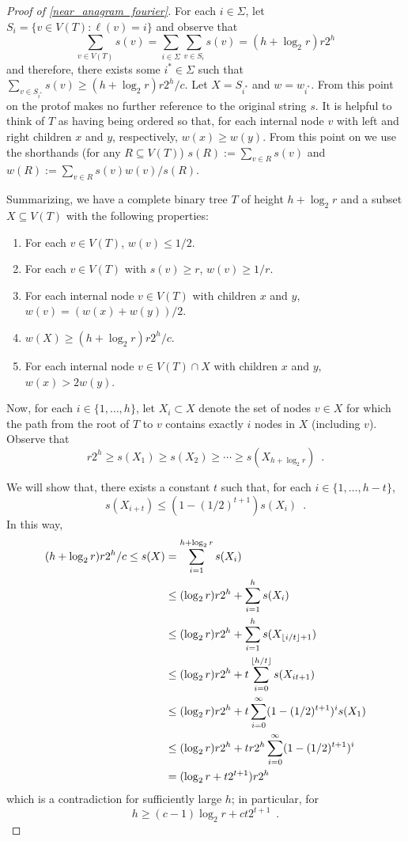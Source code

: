 \documentclass{patmorin}
\begin{document}
\begin{proof}[Proof of \cref{near_anagram_fourier}]
  For each $i\in\Sigma$, let $S_i=\{v\in V(T): \ell(v)=i\}$ and observe that
  \[
      \sum_{v\in V(T)}s(v)=\sum_{i\in\Sigma} \sum_{v\in S_i} s(v) = (h+\log_2 r)r2^{h}
  \]
  and therefore, there exists some $i^*\in\Sigma$ such that $\sum_{v\in
  S_{i^*}}s(v)\ge (h+\log_2 r)r2^h/c$.  Let $X=S_{i^*}$ and $w=w_{i^*}$.
  From this point on the pro{t}of makes no further reference to the original
  string $s$.  It is helpful to think of $T$ as having being ordered
  so that, for each internal node $v$ with left and right children $x$
  and $y$, respectively, $w(x)\ge w(y)$.  From this point on we use
  the shorthands (for any $R\subseteq V(T)$) $s(R):=\sum_{v\in R}s(v)$
  and $w(R):=\sum_{v\in R}s(v)w(v)/s(R)$.

  Summarizing, we have a complete binary tree $T$ of height $h+\log_2 r$ and
  a subset $X\subseteq V(T)$ with the following properties:
  \begin{enumerate}
    \item For each $v\in V(T)$, $w(v) \le 1/2$.
    \item For each $v\in V(T)$ with $s(v) \ge r$, $w(v)\ge 1/r$.
    \item For each internal node $v\in V(T)$ with children $x$ and $y$,
       $w(v) = (w(x)+w(y))/2$.
    \item $w(X) \ge (h+\log_2 r)r2^{h}/c$.
     \item For each internal node $v\in V(T)\cap X$ with children $x$ and $y$,
       $w(x) > 2w(y)$.
  \end{enumerate}
  Now, for each $i\in\{1,\ldots,h\}$, let $X_i\subset X$ denote the
  set of nodes $v\in X$ for which the path from the root of $T$ to $v$
  contains exactly $i$ nodes in $X$ (including $v$).  Observe that
  \[  r2^h \ge s(X_1) \ge s(X_2) \ge \cdots\ge s(X_{h+\log_2 r}) \enspace . \]

  We will show that, there exists a constant $t$ such that,
  for each $i\in\{1,\ldots,h-t\}$,
  \begin{equation}
     s(X_{i+t}) \le (1-(1/2)^{t+1}) s(X_i) \enspace . \label{t}
  \end{equation}
  In this way,
  \begin{align*}
     (h+\log_2 r)r2^{h}/c
        \le s(X) & = \sum_{i=1}^{h+\log_2 r} s(X_i) \\
           &\le (\log_2 r)r2^{h}+\sum_{i=1}^{h} s(X_i) \\
           &\le (\log_2 r)r2^{h}+\sum_{i=1}^{h} s(X_{{\lfloor i/t \rfloor}+1}) \\
           &\le (\log_2 r)r2^{h}+t\sum_{i=0}^{{\lfloor h/t \rfloor}} s(X_{it+1}) \\
           &\le (\log_2 r)r2^{h}+t\sum_{i=0}^{\infty} (1-(1/2)^{t+1})^i s(X_1) \\
           &\le (\log_2 r)r2^{h}+tr2^{h}\sum_{i=0}^{\infty} (1-(1/2)^{t+1})^i  \\
           & = (\log_2 r+t2^{t+1})r2^{h}
  \end{align*}
  which is a contradiction for sufficiently large $h$; in particular, for
  \[
        h \ge (c-1)\log_2 r+ ct2^{t+1} \enspace .
  \]


\end{proof}
\end{document}
